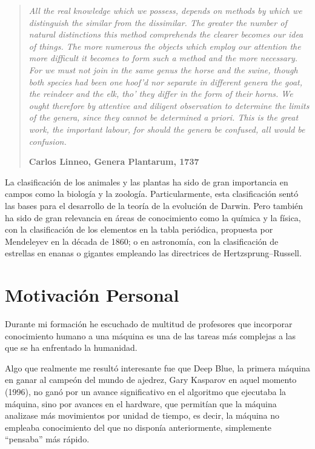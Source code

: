 \begin{quotation}{\slshape
		All the real knowledge which we possess, depends on methods by which we distinguish the similar from the dissimilar. The greater the number of natural distinctions this method comprehends the clearer becomes our idea of things. The
		more numerous the objects which employ our attention the more difficult it becomes to
		form such a method and the more necessary.
		For we must not join in the same genus the horse and the swine, though both species
		had been one hoof’d nor separate in different genera the goat, the reindeer and the elk,
		tho’ they differ in the form of their horns. We ought therefore by attentive and diligent
		observation to determine the limits of the genera, since they cannot be determined a
		priori. This is the great work, the important labour, for should the genera be confused,
		all would be confusion.} 
		\begin{flushright}
			\textbf{Carlos Linneo, Genera Plantarum, 1737}
		\end{flushright}
\end{quotation}

La clasificación de los animales y las plantas ha sido de gran importancia en campos como la biología y la zoología. Particularmente, esta clasificación sentó las bases para el desarrollo de la teoría de la evolución de Darwin. Pero también ha sido de gran relevancia en áreas de conocimiento como la química y la física, con la clasificación de los elementos en la tabla periódica, propuesta por Mendeleyev en la década de 1860; o en astronomía, con la clasificación de estrellas en enanas o gigantes empleando las directrices de Hertzsprung–Russell.

\section{Motivación Personal}

Durante mi formación he escuchado de multitud de profesores que incorporar conocimiento humano a una máquina es una de las tareas más complejas a las que se ha enfrentado la humanidad.

Algo que realmente me resultó interesante fue que Deep Blue, la primera máquina en ganar al campeón del mundo de ajedrez, Gary Kasparov en aquel momento (1996), no ganó por un avance significativo en el algoritmo que ejecutaba la máquina, sino por avances en el hardware, que permitían que la máquina analizase más movimientos por unidad de tiempo, es decir, la máquina no empleaba conocimiento del que no disponía anteriormente, simplemente ``pensaba'' más rápido.

